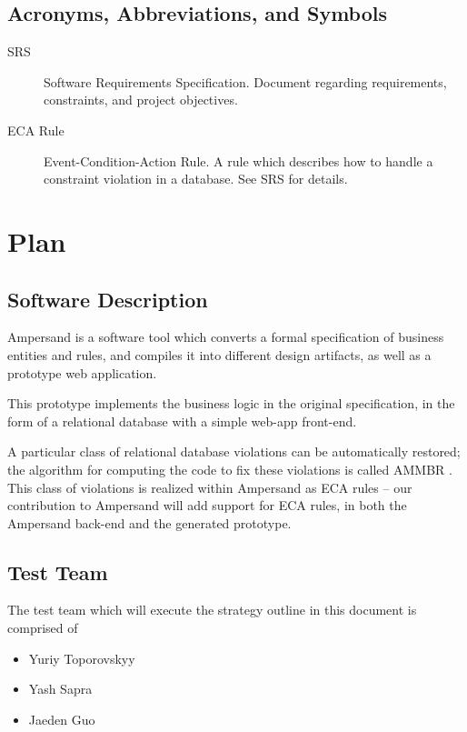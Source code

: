 \documentclass[12pt]{report}
\begin{document}
\section{Acronyms, Abbreviations, and Symbols}

\begin{description}
\item[SRS] Software Requirements Specification. Document regarding requirements, constraints, and project objectives.
\item[ECA Rule] Event-Condition-Action Rule. A rule which describes how to
  handle a constraint violation in a database. See SRS for details.
\end{description}

%
%

\chapter{Plan}

\section{Software Description}
Ampersand is a software tool which converts a formal specification of business
entities and rules, and compiles it into different design artifacts, as well as
a prototype web application.

This prototype implements the business logic in the original specification, in
the form of a relational database with a simple web-app front-end.

A particular class of relational database violations can be automatically
restored; the algorithm for computing the code to fix these violations is called
AMMBR \cite{amber}.  This class of violations is realized within Ampersand as
ECA rules -- our contribution to Ampersand will add support for ECA rules, in
both the Ampersand back-end and the generated prototype.

\section{Test Team} 

The test team which will execute the strategy outline in this document is comprised of
\begin{itemize}
\item Yuriy Toporovskyy  
\item Yash Sapra        
\item Jaeden Guo         
\end{itemize}
\end{document}
